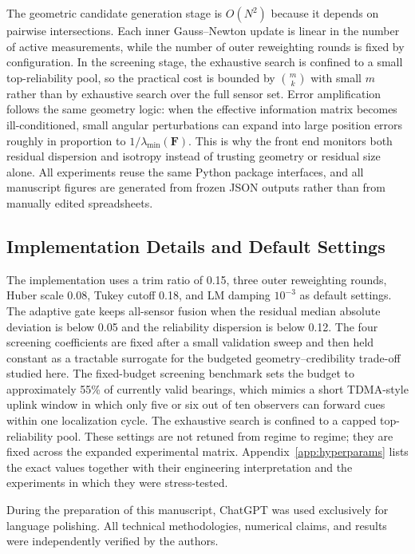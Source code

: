 \documentclass[drones,article,submit,pdftex,moreauthors]{Definitions/mdpi}
\begin{document}
The geometric candidate generation stage is $O(N^2)$ because it depends on pairwise intersections. Each inner Gauss--Newton update is linear in the number of active measurements, while the number of outer reweighting rounds is fixed by configuration. In the screening stage, the exhaustive search is confined to a small top-reliability pool, so the practical cost is bounded by $\binom{m}{k}$ with small $m$ rather than by exhaustive search over the full sensor set. Error amplification follows the same geometry logic: when the effective information matrix becomes ill-conditioned, small angular perturbations can expand into large position errors roughly in proportion to $1/\lambda_{\min}(\mathbf{F})$. This is why the front end monitors both residual dispersion and isotropy instead of trusting geometry or residual size alone. All experiments reuse the same Python package interfaces, and all manuscript figures are generated from frozen JSON outputs rather than from manually edited spreadsheets.

\subsection{Implementation Details and Default Settings}

The implementation uses a trim ratio of 0.15, three outer reweighting rounds, Huber scale 0.08, Tukey cutoff 0.18, and LM damping $10^{-3}$ as default settings. The adaptive gate keeps all-sensor fusion when the residual median absolute deviation is below 0.05 and the reliability dispersion is below 0.12. The four screening coefficients are fixed after a small validation sweep and then held constant as a tractable surrogate for the budgeted geometry--credibility trade-off studied here. The fixed-budget screening benchmark sets the budget to approximately 55\% of currently valid bearings, which mimics a short TDMA-style uplink window in which only five or six out of ten observers can forward cues within one localization cycle. The exhaustive search is confined to a capped top-reliability pool. These settings are not retuned from regime to regime; they are fixed across the expanded experimental matrix. Appendix~\ref{app:hyperparams} lists the exact values together with their engineering interpretation and the experiments in which they were stress-tested.

During the preparation of this manuscript, ChatGPT was used exclusively for language polishing. All technical methodologies, numerical claims, and results were independently verified by the authors.
\end{document}
